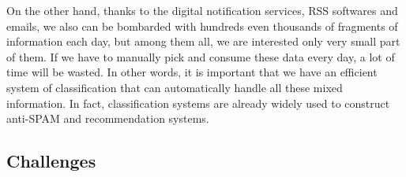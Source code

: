 \documentclass[10pt,twocolumn,letterpaper]{article}
\begin{document}
On the other hand, thanks to the digital notification services, RSS softwares and emails, we also can be bombarded with hundreds even thousands of fragments of information each day, but among them all, we are interested only very small part of them. If we have to manually pick and consume these data every day, a lot of time will be wasted. In other words, it is important that we have an efficient system of classification that can automatically handle all these mixed information. In fact, classification systems are already widely used to construct anti-SPAM and recommendation systems\cite{murphy_2013}.

\subsection{Challenges}
\end{document}
